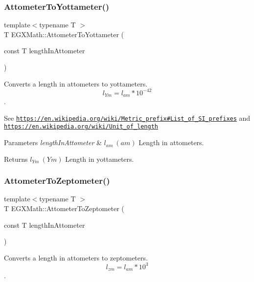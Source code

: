 \subsubsection{\texorpdfstring{Attometer\+To\+Yottameter()}{AttometerToYottameter()}}
{\footnotesize\ttfamily template$<$typename T $>$ \\
T E\+G\+X\+Math\+::\+Attometer\+To\+Yottameter (\begin{DoxyParamCaption}\item[{const T}]{length\+In\+Attometer }\end{DoxyParamCaption})}



Converts a length in attometers to yottameters. \[ l_{Ym}=l_{am} * 10^{-42} \]. 

See \href{https://en.wikipedia.org/wiki/Metric_prefix#List_of_SI_prefixes}{\tt https\+://en.\+wikipedia.\+org/wiki/\+Metric\+\_\+prefix\#\+List\+\_\+of\+\_\+\+S\+I\+\_\+prefixes} and \href{https://en.wikipedia.org/wiki/Unit_of_length}{\tt https\+://en.\+wikipedia.\+org/wiki/\+Unit\+\_\+of\+\_\+length} 
\begin{DoxyParams}{Parameters}
{\em length\+In\+Attometer} & $ l_{am}\ (am)$ Length in attometers. \\
\hline
\end{DoxyParams}
\begin{DoxyReturn}{Returns}
$ l_{Ym}\ (Ym)$ Length in yottameters. 
\end{DoxyReturn}
\mbox{\label{group___e_g_x_math-_conversions-_length_conversions-_attometer-_s_i_ga88493321ed49951744e5afe2b0bf7e5c}} 
\subsubsection{\texorpdfstring{Attometer\+To\+Zeptometer()}{AttometerToZeptometer()}}
{\footnotesize\ttfamily template$<$typename T $>$ \\
T E\+G\+X\+Math\+::\+Attometer\+To\+Zeptometer (\begin{DoxyParamCaption}\item[{const T}]{length\+In\+Attometer }\end{DoxyParamCaption})}



Converts a length in attometers to zeptometers. \[ l_{zm}=l_{am} * 10^{3} \]. 

